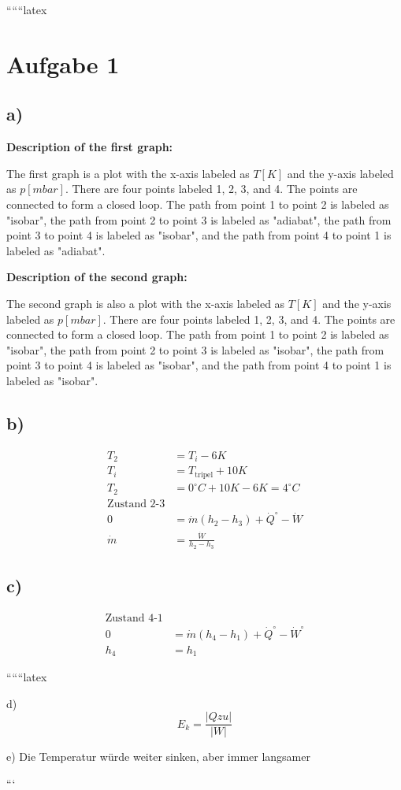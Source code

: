 
``````latex


\section*{Aufgabe 1}

\subsection*{a)}

\textbf{Description of the first graph:} 

The first graph is a plot with the x-axis labeled as \( T [K] \) and the y-axis labeled as \( p [mbar] \). There are four points labeled 1, 2, 3, and 4. The points are connected to form a closed loop. The path from point 1 to point 2 is labeled as "isobar", the path from point 2 to point 3 is labeled as "adiabat", the path from point 3 to point 4 is labeled as "isobar", and the path from point 4 to point 1 is labeled as "adiabat".

\textbf{Description of the second graph:} 

The second graph is also a plot with the x-axis labeled as \( T [K] \) and the y-axis labeled as \( p [mbar] \). There are four points labeled 1, 2, 3, and 4. The points are connected to form a closed loop. The path from point 1 to point 2 is labeled as "isobar", the path from point 2 to point 3 is labeled as "isobar", the path from point 3 to point 4 is labeled as "isobar", and the path from point 4 to point 1 is labeled as "isobar".

\subsection*{b)}

\begin{align*}
T_2 &= T_i - 6K \\
T_i &= T_{\text{tripel}} + 10K \\
T_2 &= 0^\circ C + 10K - 6K = 4^\circ C \\
\text{Zustand 2-3} \\
0 &= \dot{m} (h_2 - h_3) + \dot{Q}^{\circ} - \dot{W} \\
\dot{m} &= \frac{\dot{W}}{h_2 - h_3}
\end{align*}

\subsection*{c)}

\begin{align*}
\text{Zustand 4-1} \\
0 &= \dot{m} (h_4 - h_1) + \dot{Q}^{\circ} - \dot{W}^{\circ} \\
h_4 &= h_1
\end{align*}

``````latex


d) \[ E_k = \frac{|Qzu|}{|W|} \]

e) Die Temperatur würde weiter sinken, aber immer langsamer

```